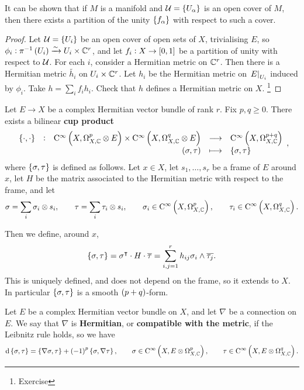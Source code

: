 It can be shown that if $ M $ is a manifold and $ \UUU = \cbr{U_\alpha} $ is an open cover of $ M $, then there exists a partition of the unity $ \cbr{f_\alpha} $ with respect to such a cover.

\begin{proof}
Let $ \UUU = \cbr{U_i} $ be an open cover of open sets of $ X $, trivialising $ E $, so $ \phi_i : \pi^{-1}\br{U_i} \xrightarrow{\sim} U_i \times \CC^r $, and let $ f_i : X \to \sbr{0, 1} $ be a partition of unity with respect to $ \mathcal{U} $. For each $ i $, consider a Hermitian metric on $ \mathbb{C}^r $. Then there is a Hermitian metric $ \widetilde{h_i} $ on $ U_i \times \mathbb{C}^r $. Let $ h_i $ be the Hermitian metric on $ \left. E \right|_{U_i} $ induced by $ \phi_i $. Take $ h = \sum_i f_ih_i $. Check that $ h $ defines a Hermitian metric on $ X $. \footnote{Exercise}
\end{proof}


Let $ E \to X $ be a complex Hermitian vector bundle of rank $ r $. Fix $ p, q \ge 0 $. There exists a bilinear \textbf{cup product}
$$ \function[\cbr{\cdot, \cdot}]{\C^\infty\br{X, \Omega_{X, \CC}^p \otimes E} \times \C^\infty\br{X, \Omega_{X, \CC}^q \otimes E}}{\C^\infty\br{X, \Omega_{X, \CC}^{p + q}}}{\br{\sigma, \tau}}{\cbr{\sigma, \tau}}, $$
where $ \cbr{\sigma, \tau} $ is defined as follows. Let $ x \in X $, let $ s_1, \dots, s_r $ be a frame of $ E $ around $ x $, let $ H $ be the matrix associated to the Hermitian metric with respect to the frame, and let
$$ \sigma = \sum_i \sigma_i \otimes s_i, \qquad \tau = \sum_i \tau_i \otimes s_i, \qquad \sigma_i \in \C^\infty\br{X, \Omega_{X, \CC}^p}, \qquad \tau_i \in \C^\infty\br{X, \Omega_{X, \CC}^q}. $$

\pagebreak

Then we define, around $ x $,
$$ \cbr{\sigma, \tau} = \sigma^\intercal \cdot H \cdot \overline{\tau} = \sum_{i, j = 1}^r h_{ij}\sigma_i \wedge \overline{\tau_j}. $$
This is uniquely defined, and does not depend on the frame, so it extends to $ X $. In particular $ \cbr{\sigma, \tau} $ is a smooth $ \br{p + q} $-form.

\begin{definition}
Let $ E $ be a complex Hermitian vector bundle on $ X $, and let $ \nabla $ be a connection on $ E $. We say that $ \nabla $ is \textbf{Hermitian}, or \textbf{compatible with the metric}, if the Leibnitz rule holds, so we have
$$ \d\cbr{\sigma, \tau} = \cbr{\nabla\sigma, \tau} + \br{-1}^p\cbr{\sigma, \nabla\tau}, \qquad \sigma \in \C^\infty\br{X, E \otimes \Omega_{X, \CC}^p}, \qquad \tau \in \C^\infty\br{X, E \otimes \Omega_{X, \CC}^q}. $$
\end{definition}


